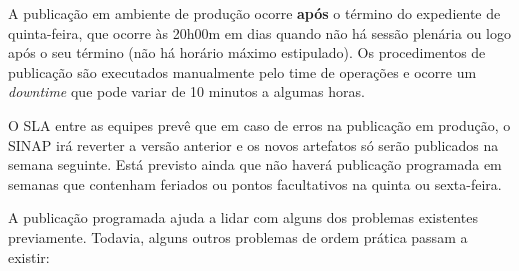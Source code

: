 A publicação em ambiente de produção ocorre \textbf{após} o término do
expediente de quinta-feira, que ocorre às 20h00m em dias quando não há sessão
plenária ou logo após o seu término (não há horário máximo estipulado).
Os procedimentos de publicação são executados manualmente pelo time de
operações e ocorre um \textit{downtime} que pode variar de 10 minutos a algumas
horas.

O \acrshort{SLA} entre as equipes prevê que em caso de erros na publicação em
produção, o \acrshort{SINAP} irá reverter a versão anterior e os novos
artefatos só serão publicados na semana seguinte. Está previsto ainda que
não haverá publicação programada em semanas que contenham feriados ou pontos
facultativos na quinta ou sexta-feira.

A publicação programada ajuda a lidar com alguns dos problemas existentes
previamente. Todavia, alguns outros problemas de ordem prática passam a existir:

